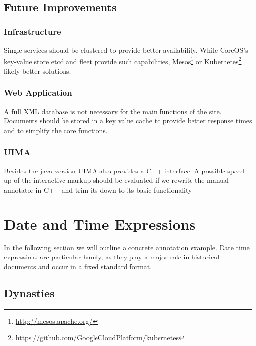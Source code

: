 \documentclass[12pt, draft]{article}
\begin{document}
\subsection{Future Improvements}

\subsubsection{Infrastructure}
Single services should be clustered to provide better availability. While CoreOS's key-value store etcd
and fleet provide such capabilities, Mesos\footnote{\url{http://mesos.apache.org/}}
 or Kubernetes\footnote{\url{https://github.com/GoogleCloudPlatform/kubernetes}}
 likely better solutions.

\subsubsection{Web Application}

A full XML database is not necessary for the main functions of the site.
Documents should be stored in a key value cache to provide
better response times and to simplify the core functions.

\subsubsection{UIMA}
Besides the java version UIMA also provides a C++ interface.
A possible speed up of the interactive markup should be evaluated
if we rewrite the manual annotator in C++ and trim its down to its basic
functionality.

\section{Date and Time Expressions}

In the following section we will outline a concrete annotation example.
Date time expressions are particular handy, as they play a major role in 
historical documents and occur in a fixed standard format.

\subsection{Dynasties}
\end{document}
